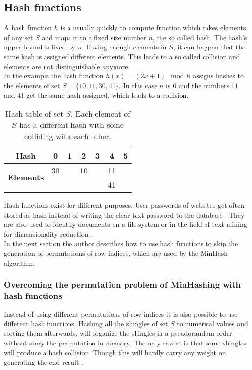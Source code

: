 \subsection{Hash functions}
A hash function $ h $ is a usually quickly to compute function which takes  elements of any set $ S $ and maps it to a fixed size number $ n $, the so called hash. The hash's upper bound is fixed by $ n $. Having enough elements in $ S $, it can happen that the same hash is assigned different elements. This leads to a so called collision and elements are not distinguishable anymore.\\

In the example the hash function $ h(x) = (2x+1) \mod 6 $ assigns hashes to the elements of set $ S = \{ 10,11,30,41 \} $.  In this case $ n $ is $ 6 $ and the numbers $ 11 $ and $ 41 $ get the same hash assigned, which leads to a collision.\\

\begin{table}[H]
    \centering
    \begin{tabular}{| c | c | c | c | c | c | c |}
        \hline
        \textbf{Hash} & \textbf{0} & \textbf{1} & \textbf{2} & \textbf{3} & \textbf{4} & \textbf{5}  \\
        \hline
        \multirow{2}{*}{\textbf{Elements}}   & 30 &    & 10 &    & 11 & \\
        &    &    &    &    & 41  &\\
        \hline
    \end{tabular}    
    \caption{Hash table of set $ S $. Each element of $ S $ has a different  hash with some colliding with each other.}
\end{table}

Hash functions exist for different purposes. User passwords of websites get often stored as hash instead of writing the clear text password to the database \cite{cryptographicHashFunctions}. They are also used to identify documents on a file system or in the field of text mining for dimensionality reduction \cite{practicalHashFunctions}.\\

In the next section the author describes how to use hash functions to skip the generation of permutations of row indices, which are used by the MinHash algorithm.\\

\subsubsection{Overcoming the permutation problem of MinHashing with hash functions} Instead of using different permutations of row indices it is also possible to use different hash functions. Hashing all the shingles of set $ S $ to numerical values and sorting them afterwards, will organize the shingles in a pseudorandom order without story the permutation in memory. The only caveat is that some shingles will produce a hash collision. Though this will hardly carry any weight on generating the end result \cite{minhash}.\\

